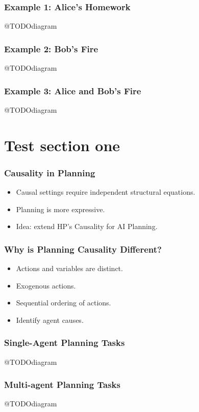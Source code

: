 \documentclass{beamer}
\theoremstyle{plain}
\theoremstyle{definition}
\begin{document}
\begin{frame}
\frametitle{Example 1: Alice's Homework}
@TODOdiagram
\end{frame}


\begin{frame}
\frametitle{Example 2: Bob's Fire}
@TODOdiagram
\end{frame}


\begin{frame}
\frametitle{Example 3: Alice and Bob's Fire}
@TODOdiagram
\end{frame}

\section{Test section one}

\begin{frame}
\frametitle{Causality in Planning}
\begin{itemize}
\item Causal settings require independent structural equations.
\item Planning is more expressive.
\item Idea: extend HP's Causality for AI Planning.
\end{itemize}

\end{frame}



\begin{frame}
\frametitle{Why is Planning Causality Different?}
\begin{itemize}
\item Actions and variables are distinct.
\item Exogenous actions.
\item Sequential ordering of actions.
\item Identify agent causes.
\end{itemize}

\end{frame}


\begin{frame}
\frametitle{Single-Agent Planning Tasks}
@TODOdiagram

\end{frame}


\begin{frame}
\frametitle{Multi-agent Planning Tasks}
@TODOdiagram

\end{frame}
\end{document}
